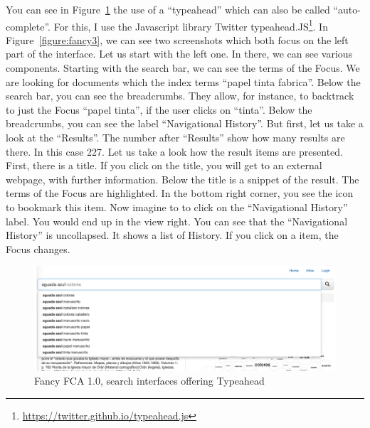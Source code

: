 \documentclass[11pt]{report}
\begin{document}
 You can see in Figure~\ref{figure:fancy2} the use of a ``typeahead'' which can also be called ``auto-complete''. For this, I use the Javascript library Twitter typeahead.JS\footnote{\url{https://twitter.github.io/typeahead.js}}. In Figure~\ref{figure:fancy3}, we can see two screenshots which both focus on the left part of the interface. Let us start with the left one. In there, we can see various components. Starting with the search bar, we can see the terms of the Focus. We are looking for documents which the index terms ``papel tinta fabrica''. Below the search bar, you can see the breadcrumbs. They allow, for instance, to backtrack to just the Focus ``papel tinta'', if the user clicks on ``tinta''. Below the breadcrumbs, you can see the label ``Navigational History''. But first, let us take a look at the ``Results''. The number after ``Results'' show how many results are there. In this case 227. Let us take a look how the result items are presented. First, there is a title. If you click on the title, you will get to an external webpage, with further information. Below the title is a snippet of the result. The terms of the Focus are highlighted. In the bottom right corner, you see the icon to bookmark this item. Now imagine to to click on the ``Navigational History'' label. You would end up in the view right. You can see that the ``Navigational History'' is uncollapsed. It shows a list of History. If you click on a item, the Focus changes. \\
 
\begin{figure}[!ht]
	\centering
	\includegraphics[width=\linewidth]{images/fancy2}
\caption{Fancy FCA 1.0, search interfaces offering Typeahead}
\label{figure:fancy2}
\end{figure}
\end{document}
